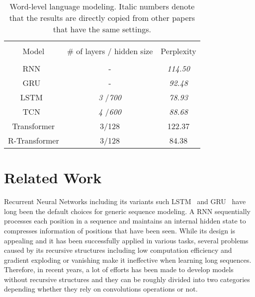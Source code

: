 \documentclass{article} \usepackage{iclr2019_conference,times}
\begin{document}
\begin{table}
\begin{center}	
		\caption{Word-level language modeling. Italic numbers denote that the results are directly copied from other papers that have the same settings.}
		\vspace{4mm}
		\label{table:ptb_w}
\begin{tabular}{ccc}
			\hline \\[-0.9ex]
			Model &  \# of layers / hidden size & Perplexity\\ [0.9ex]	
			\hline			\\[-0.9ex]
			RNN~\citep{bai2018empirical} &  -   &  {\it 114.50} \\ 	[0.5ex]		
			GRU~\citep{bai2018empirical} & - &  {\it 92.48}  \\	[0.5ex]		
			LSTM~\citep{bai2018empirical} &  {\it 3} /{\it 700} & {\it 78.93} \\[0.5ex]
			TCN~\citep{bai2018empirical} &  {\it 4} /{\it 600} &  {\it 88.68} \\[0.5ex]
			Transformer &  3/128 & 122.37\\[0.5ex]
			R-Transformer & 3/128  & 84.38 \\[0.6ex]
			\hline   
		\end{tabular}
	\end{center}
\end{table}

 \section{Related Work}
Recurrent Neural Networks including its variants such LSTM~\citep{hochreiter1997long} and GRU~\citep{cho2014learning} have long been the default choices for generic sequence modeling. A RNN sequentially processes each position in a sequence and maintains an internal hidden state to compresses information of positions that have been seen. While its design is appealing and it has been successfully applied in various tasks, several problems caused by its recursive structures including low computation efficiency and gradient exploding or vanishing make it ineffective when learning long sequences. Therefore, in recent years, a lot of efforts has been made to develop models without recursive structures and they can be roughly divided into two categories depending whether they rely on convolutions operations or not.
\end{document}
